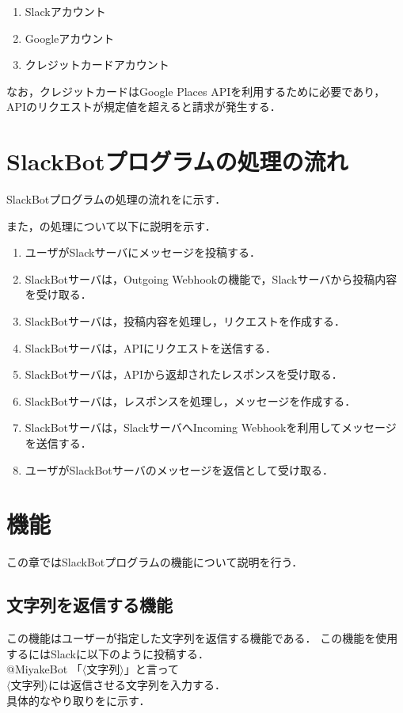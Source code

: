 \documentclass[12pt]{jsarticle}
\begin{document}
\begin{enumerate}
  \item Slackアカウント
  \item Googleアカウント
  \item クレジットカードアカウント
\end{enumerate}

なお，クレジットカードはGoogle Places APIを利用するために必要であり，
APIのリクエストが規定値を超えると請求が発生する．


\section{SlackBotプログラムの処理の流れ}\label{sec:flor}
SlackBotプログラムの処理の流れをに示す．


また，の処理について以下に説明を示す．
\begin{enumerate}
  \item ユーザがSlackサーバにメッセージを投稿する．
  \item SlackBotサーバは，Outgoing Webhookの機能で，Slackサーバから投稿内容を受け取る．
  \item SlackBotサーバは，投稿内容を処理し，リクエストを作成する．
  \item SlackBotサーバは，APIにリクエストを送信する．
  \item SlackBotサーバは，APIから返却されたレスポンスを受け取る．
  \item SlackBotサーバは，レスポンスを処理し，メッセージを作成する．
  \item SlackBotサーバは，SlackサーバへIncoming Webhookを利用してメッセージを送信する．
  \item ユーザがSlackBotサーバのメッセージを返信として受け取る．
\end{enumerate}

\section{機能}
\label{sec:function}
この章ではSlackBotプログラムの機能について説明を行う．

\subsection{文字列を返信する機能}
この機能はユーザーが指定した文字列を返信する機能である．
この機能を使用するにはSlackに以下のように投稿する．\\
@MiyakeBot 「$\langle$文字列$\rangle$」と言って\\
$\langle$文字列$\rangle$には返信させる文字列を入力する．\\
具体的なやり取りをに示す．
\end{document}
